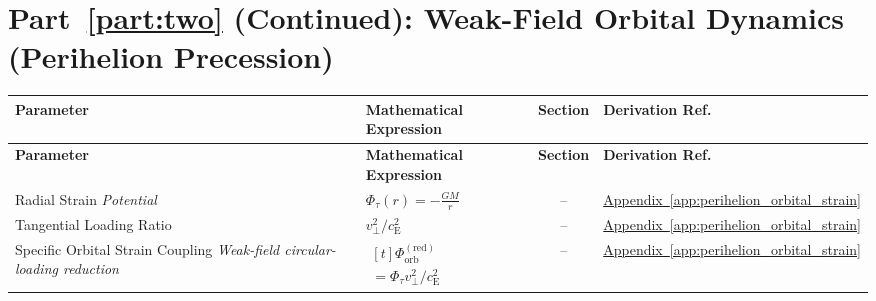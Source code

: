 \par\ifdim\dimexpr\pagegoal-\pagetotal\relax<12\baselineskip\newpage\fi
\section*{Part~\ref{part:two} (Continued): Weak-Field Orbital Dynamics (Perihelion Precession)}

\vspace{0.5cm}
\noindent
\begin{longtable}{@{} p{4.5cm} p{6cm} c p{4cm} @{}}
\toprule
\textbf{Parameter} & \textbf{Mathematical Expression} & \textbf{Section} & \textbf{Derivation Ref.} \\
\midrule
\endfirsthead
\toprule
\textbf{Parameter} & \textbf{Mathematical Expression} & \textbf{Section} & \textbf{Derivation Ref.} \\
\midrule
\endhead

{\raggedright Radial Strain \newline \textit{Potential}\par} & {\raggedright $\Phi_\tau(r) = - \frac{GM}{r}$\par} & -- & {\raggedright \hyperref[app:perihelion_orbital_strain]{Appendix~\ref*{app:perihelion_orbital_strain}}\par} \\

{\raggedright Tangential Loading Ratio\par} & {\raggedright $v_\perp^2/c_{\mathrm E}^2$\par} & -- & {\raggedright \hyperref[app:perihelion_orbital_strain]{Appendix~\ref*{app:perihelion_orbital_strain}}\par} \\

{\raggedright Specific Orbital Strain Coupling \newline \textit{Weak-field circular-loading reduction}\par} & {\raggedright $\begin{gathered}[t]\Phi_{\mathrm{orb}}^{(\mathrm{red})} \\ =\Phi_\tau v_\perp^2/c_{\mathrm E}^2\end{gathered}$\par} & -- & {\raggedright \hyperref[app:perihelion_orbital_strain]{Appendix~\ref*{app:perihelion_orbital_strain}}\par} \\


\end{longtable}
